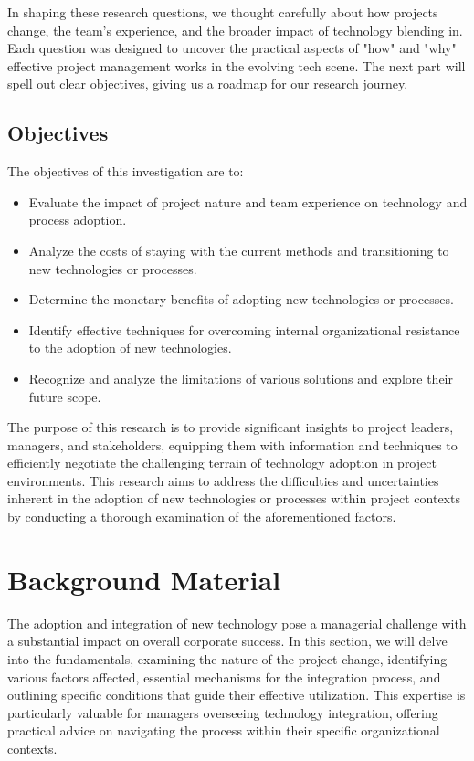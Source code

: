 \documentclass{article}
\begin{document}
\noindent In shaping these research questions, we thought carefully about how projects change, the team's experience, and the broader impact of technology blending in. Each question was designed to uncover the practical aspects of "how" and "why" effective project management works in the evolving tech scene. The next part will spell out clear objectives, giving us a roadmap for our research journey.



\subsection{Objectives}

The objectives of this investigation are to:

\begin{itemize}
  \item Evaluate the impact of project nature and team experience on technology and process adoption.
  \item Analyze the costs of staying with the current methods and transitioning to new technologies or processes.
  \item Determine the monetary benefits of adopting new technologies or processes.
  \item Identify effective techniques for overcoming internal organizational resistance to the adoption of new technologies.
  \item Recognize and analyze the limitations of various solutions and explore their future scope.
\end{itemize}

\noindent The purpose of this research is to provide significant insights to project leaders, managers, and stakeholders, equipping them with information and techniques to efficiently negotiate the challenging terrain of technology adoption in project environments. This research aims to address the difficulties and uncertainties inherent in the adoption of new technologies or processes within project contexts by conducting a thorough examination of the aforementioned factors.

\section{Background Material}
The adoption and integration of new technology pose a managerial challenge with a substantial impact on overall corporate success. In this section, we will delve into the fundamentals, examining the nature of the project change, identifying various factors affected, essential mechanisms for the integration process, and outlining specific conditions that guide their effective utilization. This expertise is particularly valuable for managers overseeing technology integration, offering practical advice on navigating the process within their specific organizational contexts.
\end{document}
